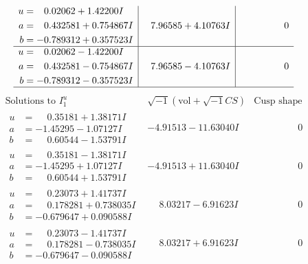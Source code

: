 \documentclass[1p]{elsarticle_modified}
\theoremstyle{definition}
\newcommand{\I}{\sqrt{-1}}
\begin{document}
$$\begin{array}{c|c|c}
\begin{aligned}
u &= \phantom{-}0.02062 + 1.42200 I \\
a &= \phantom{-}0.432581 + 0.754867 I \\
b &= -0.789312 + 0.357523 I\end{aligned}
 & \phantom{-}7.96585 + 4.10763 I & \phantom{-0.000000 } 0 \\ \hline\begin{aligned}
u &= \phantom{-}0.02062 - 1.42200 I \\
a &= \phantom{-}0.432581 - 0.754867 I \\
b &= -0.789312 - 0.357523 I\end{aligned}
 & \phantom{-}7.96585 - 4.10763 I & \phantom{-0.000000 } 0\\
 \hline 
 \end{array}$$\newpage$$\begin{array}{c|c|c}  
\text{Solutions to }I^u_{1}& \I (\text{vol} + \sqrt{-1}CS) & \text{Cusp shape}\\
 \hline 
\begin{aligned}
u &= \phantom{-}0.35181 + 1.38171 I \\
a &= -1.45295 - 1.07127 I \\
b &= \phantom{-}0.60544 - 1.53791 I\end{aligned}
 & -4.91513 - 11.63040 I & \phantom{-0.000000 } 0 \\ \hline\begin{aligned}
u &= \phantom{-}0.35181 - 1.38171 I \\
a &= -1.45295 + 1.07127 I \\
b &= \phantom{-}0.60544 + 1.53791 I\end{aligned}
 & -4.91513 + 11.63040 I & \phantom{-0.000000 } 0 \\ \hline\begin{aligned}
u &= \phantom{-}0.23073 + 1.41737 I \\
a &= \phantom{-}0.178281 + 0.738035 I \\
b &= -0.679647 + 0.090588 I\end{aligned}
 & \phantom{-}8.03217 - 6.91623 I & \phantom{-0.000000 } 0 \\ \hline\begin{aligned}
u &= \phantom{-}0.23073 - 1.41737 I \\
a &= \phantom{-}0.178281 - 0.738035 I \\
b &= -0.679647 - 0.090588 I\end{aligned}
 & \phantom{-}8.03217 + 6.91623 I & \phantom{-0.000000 } 0 \\ \hline\begin{aligned}

\end{aligned}
\end{array}$$
\end{document}
